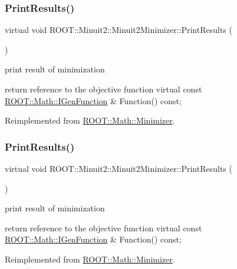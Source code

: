 \subsubsection{\texorpdfstring{PrintResults()}{PrintResults()}\hspace{0.1cm}{\footnotesize\ttfamily [2/3]}}
{\footnotesize\ttfamily virtual void R\+O\+O\+T\+::\+Minuit2\+::\+Minuit2\+Minimizer\+::\+Print\+Results (\begin{DoxyParamCaption}{ }\end{DoxyParamCaption})\hspace{0.3cm}{\ttfamily [virtual]}}



print result of minimization 

return reference to the objective function virtual const \mbox{\hyperlink{namespaceROOT_1_1Math_afe6400b4439b79d54c41fb9f5c5af171}{R\+O\+O\+T\+::\+Math\+::\+I\+Gen\+Function}} \& Function() const; 

Reimplemented from \mbox{\hyperlink{classROOT_1_1Math_1_1Minimizer_aea1c5d69c6a1c1f2cf4d17a523862560}{R\+O\+O\+T\+::\+Math\+::\+Minimizer}}.

\mbox{\label{classROOT_1_1Minuit2_1_1Minuit2Minimizer_a0caadc2005eac5d87fc7345bd54decf0}} 
\subsubsection{\texorpdfstring{PrintResults()}{PrintResults()}\hspace{0.1cm}{\footnotesize\ttfamily [3/3]}}
{\footnotesize\ttfamily virtual void R\+O\+O\+T\+::\+Minuit2\+::\+Minuit2\+Minimizer\+::\+Print\+Results (\begin{DoxyParamCaption}{ }\end{DoxyParamCaption})\hspace{0.3cm}{\ttfamily [virtual]}}



print result of minimization 

return reference to the objective function virtual const \mbox{\hyperlink{namespaceROOT_1_1Math_afe6400b4439b79d54c41fb9f5c5af171}{R\+O\+O\+T\+::\+Math\+::\+I\+Gen\+Function}} \& Function() const; 

Reimplemented from \mbox{\hyperlink{classROOT_1_1Math_1_1Minimizer_aea1c5d69c6a1c1f2cf4d17a523862560}{R\+O\+O\+T\+::\+Math\+::\+Minimizer}}.


